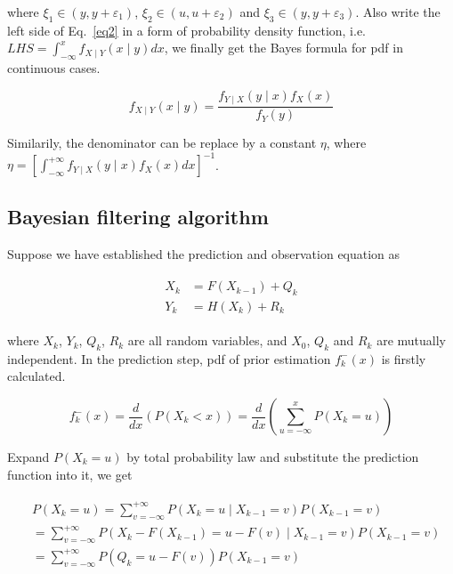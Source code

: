\documentclass[conference]{IEEEtran}
\begin{document}
	where $\xi _{1}\in (y,y+\varepsilon_{1})$, $\xi _{2}\in (u,u+\varepsilon_{2})$ and $\xi _{3}\in (y,y+\varepsilon_{3})$. Also write the left side of Eq.~\ref{eq2} in a form of probability density function, i.e. $LHS=\int_{-\infty}^{x}f_{X\mid Y}(x\mid y)dx$, we finally get the Bayes formula for pdf in continuous cases.
	
	\begin{equation}
		f_{X\mid Y}(x\mid y)=\frac{f_{Y\mid X}(y\mid x)f_{X}(x)}{f_{Y}(y)}
		\label{eq3}
	\end{equation}
	
	Similarily, the denominator can be replace by a constant $\eta$, where $\eta=[\int_{-\infty}^{+\infty}f_{Y\mid X}(y\mid x)f_{X}(x)dx]^{-1}$. 
	
	\subsection{Bayesian filtering algorithm}
	
	Suppose we have established the prediction and observation equation as
	
	\begin{equation}
	\begin{split}
	\begin{aligned}
	X_{k}&=F(X_{k-1})+Q_{k}\\
	Y_{k}&=H(X_{k})+R_{k}
	\label{eq4}
	\end{aligned}
	\end{split}
	\end{equation}
	
	where $X_{k}$, $Y_{k}$, $Q_{k}$, $R_{k}$ are all random variables, and $X_{0}$, $Q_{k}$ and $R_{k}$ are mutually independent. In the prediction step, pdf of prior estimation $f_{k}^{-}(x)$ is firstly calculated.
	
	\begin{equation}
		f_{k}^{-}(x)=\frac{d}{dx}(P(X_{k}<x))=\frac{d}{dx}(\sum_{u=-\infty}^{x}P(X_{k}=u))
		\label{eq5}
	\end{equation}
	
	Expand $P(X_{k}=u)$ by total probability law and substitute the prediction function into it, we get
	
	\begin{equation}
	\begin{split}
	\begin{aligned}
	&P(X_{k}=u)=\sum_{v=-\infty}^{+\infty}P(X_{k}=u\mid X_{k-1}=v)P(X_{k-1}=v)\\
	&=\sum_{v=-\infty}^{+\infty}P(X_{k}-F(X_{k-1})=u-F(v)\mid X_{k-1}=v)P(X_{k-1}=v)\\
	&=\sum_{v=-\infty}^{+\infty}P(Q_{k}=u-F(v))P(X_{k-1}=v)
	\nonumber
	\end{aligned}
	\end{split}
	\end{equation}
	
\end{document}
